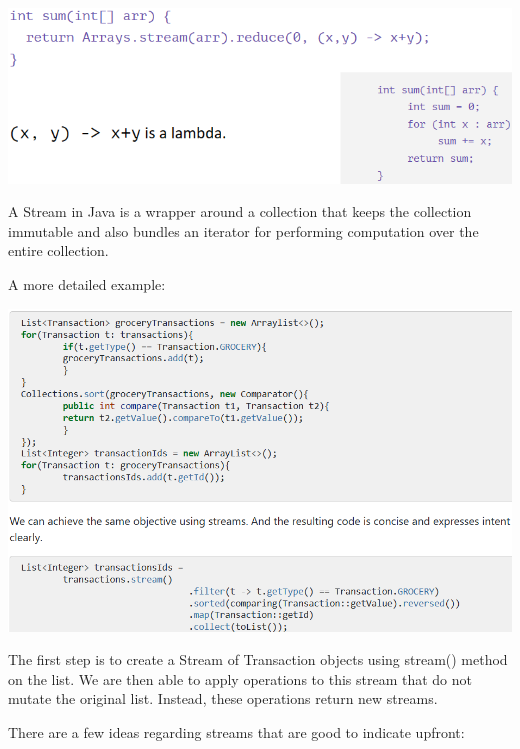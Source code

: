 \documentclass[letterpaper,12pt]{article}
\begin{document}
\includegraphics*[scale=0.7]{./summary_image/Streams example.png}

A Stream in Java is a wrapper around a collection that keeps the collection
immutable and also bundles an iterator for performing computation over the
entire collection.

A more detailed example:

\includegraphics*[scale=0.6]{./summary_image/Streams Reading example.png}

The first step is to create a Stream of Transaction objects using stream()
method on the list. We are then able to apply operations to this stream that do
not mutate the original list. Instead, these operations return new streams.

There are a few ideas regarding streams that are good to indicate upfront:
\end{document}

